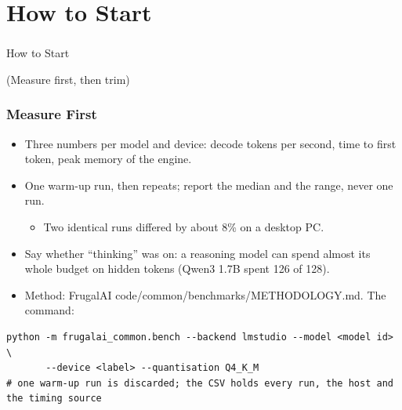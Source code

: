 
\section[Start]{How to Start}

\begin{frame}[fragile]\frametitle{}
\begin{center}
{\Large How to Start}

\medskip
{\small (Measure first, then trim)}
\end{center}
\end{frame}

\begin{frame}[fragile]\frametitle{Measure First}
\begin{itemize}
\item Three numbers per model and device: decode tokens per second, time to first token, peak memory of the engine.
\item One warm-up run, then repeats; report the median and the range, never one run.
	\begin{itemize}
	\item Two identical runs differed by about 8\% on a desktop PC.
	\end{itemize}
\item Say whether ``thinking'' was on: a reasoning model can spend almost its whole budget on hidden tokens (Qwen3 1.7B spent 126 of 128).
\item Method: FrugalAI code/common/benchmarks/METHODOLOGY.md. The command:
\end{itemize}
\begin{lstlisting}
python -m frugalai_common.bench --backend lmstudio --model <model id> \
       --device <label> --quantisation Q4_K_M
# one warm-up run is discarded; the CSV holds every run, the host and the timing source
\end{lstlisting}
\end{frame}


